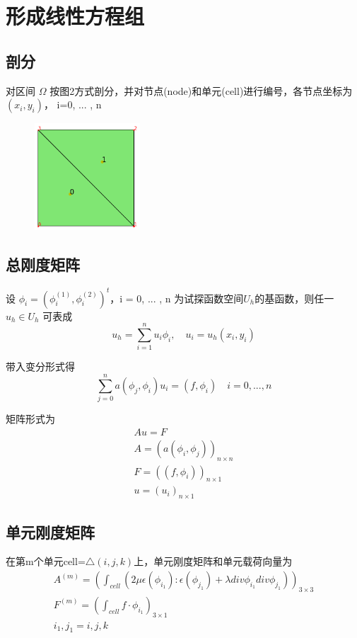 \documentclass[UTF8,titlepage,twocolumn]{ctexart}
\begin{document}
\section{形成线性方程组}

\subsection{剖分}

对区间 $\Omega$ 按图2方式剖分，并对节点(node)和单元(cell)进行编号，各节点坐标为$(x_i,y_i)$， i=0, ... , n

\begin{figure}[hb]
	\centering
	\includegraphics[height=4cm,width=4cm]{../image/subdivsion.png}
	\caption{}
\end{figure}

\subsection{总刚度矩阵}

设 $\phi_i = (\phi_i^{(1)}, \phi_i^{(2)})^t$，i = 0, ... , n 为试探函数空间$U_h$的基函数，则任一 $u_h \in U_h$ 可表成
$$
	u_h = \sum\limits_{i=1}^n u_i \phi_i, \quad u_i = u_h(x_i,y_i)
$$ 

带入变分形式得
$$
	\sum\limits_{j=0}^n a(\phi_j, \phi_i) u_i = (f,\phi_i) \quad i=0, ... ,n
$$

矩阵形式为
$$
\begin{matrix}
	A u = F \\
	A = (a(\phi_i, \phi_j))_{n \times n} \\
	F = ((f,\phi_i))_{n \times 1} \\
	u = (u_i)_{n \times 1}
\end{matrix}
$$

\subsection{单元刚度矩阵}

在第m个单元cell=$\bigtriangleup(i,j,k)$上，单元刚度矩阵和单元载荷向量为
$$
\begin{matrix}
	A^{(m)} = (\int_{cell} (2 \mu \epsilon(\phi_{i_1}) : \epsilon(\phi_{j_1}) + \lambda div \phi_{i_1} div \phi_{j_1}))_{3 \times 3} \\
	F^{(m)} = (\int_{cell} f \cdot \phi_{i_1})_{3 \times 1} \\
	i_1, j_1 = i, j, k
\end{matrix} 
$$
\end{document}
